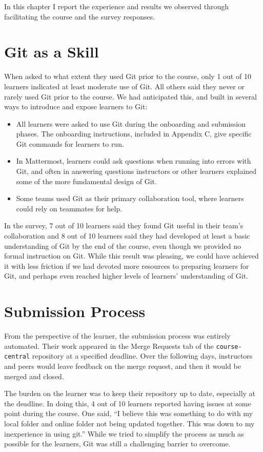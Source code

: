 \documentclass[12pt,twoside]{mitthesis}
\begin{document}
In this chapter I report the experience and results we observed through facilitating the course and the survey responses.

\section{Git as a Skill}

When asked to what extent they used Git prior to the course, only 1 out of 10 learners indicated at least moderate use of Git. All others said they never or rarely used Git prior to the course. We had anticipated this, and built in several ways to introduce and expose learners to Git:
\begin{itemize}
\item All learners were asked to use Git during the onboarding and submission phases. The onboarding instructions, included in Appendix C, give specific Git commands for learners to run.
\item In Mattermost, learners could ask questions when running into errors with Git, and often in answering questions instructors or other learners explained some of the more fundamental design of Git.
\item Some teams used Git as their primary collaboration tool, where learners could rely on teammates for help.
\end{itemize}
In the survey, 7 out of 10 learners said they found Git useful in their team's collaboration and 8 out of 10 learners said they had developed at least a basic understanding of Git by the end of the course, even though we provided no formal instruction on Git. While this result was pleasing, we could have achieved it with less friction if we had devoted more resources to preparing learners for Git, and perhaps even reached higher levels of learners' understanding of Git.

\section{Submission Process}

From the perspective of the learner, the submission process was entirely automated. Their work appeared in the Merge Requests tab of the \texttt{course-central} repository at a specified deadline. Over the following days, instructors and peers would leave feedback on the merge request, and then it would be merged and closed.

The burden on the learner was to keep their repository up to date, especially at the deadline. In doing this, 4 out of 10 learners reported having issues at some point during the course. One said, ``I believe this was something to do with my local folder and online folder not being updated together. This was down to my inexperience in using git.'' While we tried to simplify the process as much as possible for the learners, Git was still a challenging barrier to overcome.
\end{document}
